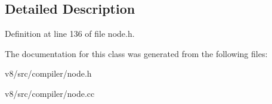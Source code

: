 \subsection{Detailed Description}


Definition at line 136 of file node.\+h.



The documentation for this class was generated from the following files\+:\begin{DoxyCompactItemize}
\item 
v8/src/compiler/node.\+h\item 
v8/src/compiler/node.\+cc\end{DoxyCompactItemize}
